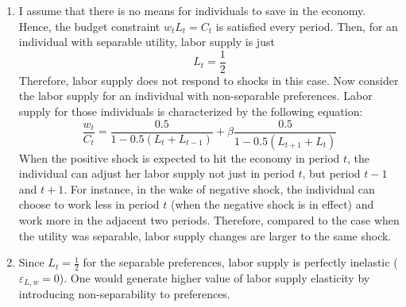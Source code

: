 \documentclass[11pt]{amsart}
\begin{document}
\begin{enumerate}[label=(\alph*)]
    \item I assume that there is no means for individuals to save in the economy. Hence, the budget constraint $w_t L_t = C_t$ is satisfied every period. Then, for an individual with separable utility, labor supply is just 
    \begin{equation*}
    L_t = \frac{1}{2}
    \end{equation*}
    Therefore, labor supply does not respond to shocks in this case. Now consider the labor supply for an individual with non-separable preferences. Labor supply for those individuals is characterized by the following equation:
    \begin{equation*}
    \frac{w_t}{C_t}  = \frac{0.5}{1 - 0.5 \left( L_t + L_{t-1} \right)} + \beta \frac{0.5}{1 - 0.5 \left( L_{t+1} + L_t \right)}
    \end{equation*}
    When the positive shock is expected to hit the economy in period $t$, the individual can adjust her labor supply not just in period $t$, but period $t-1$ and $t+1$. For instance, in the wake of negative shock, the individual can choose to work less in period $t$ (when the negative shock is in effect) and work more in the adjacent two periods. Therefore, compared to the case when the utility was separable, labor supply changes are larger to the same shock. 
    
    \item Since $L_t = \frac{1}{2}$ for the separable preferences, labor supply is perfectly inelastic ($\varepsilon_{L,w} = 0$). One would generate higher value of labor supply elasticity by introducing non-separability to preferences. 
\end{enumerate}
\end{document}
